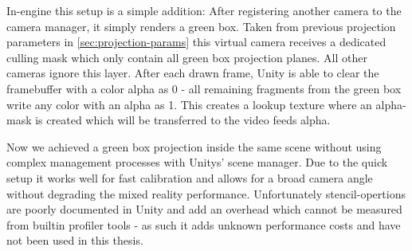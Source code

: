 In-engine this setup is a simple addition: After registering another camera to 
the camera manager, it simply renders a green box. Taken from previous 
projection parameters in \ref{sec:projection-params} this virtual camera 
receives a dedicated culling mask which only contain all green box projection 
planes. All other cameras ignore this layer. After each drawn frame, Unity is 
able to clear the framebuffer with a color alpha as 0 - all remaining fragments 
from the green box write any color with an alpha as 1. This creates a lookup 
texture where an alpha-mask is created which will be transferred to the video 
feeds alpha.

Now we achieved a green box projection inside the same scene without using 
complex management processes with Unitys' scene manager. Due to the quick setup 
it works well for fast calibration and allows for a broad camera angle without 
degrading the mixed reality performance.
\newline
Unfortunately stencil-opertions are poorly documented in Unity and add an 
overhead which cannot be measured from builtin profiler tools - as such it adds 
unknown performance costs and have not been used in this thesis.
